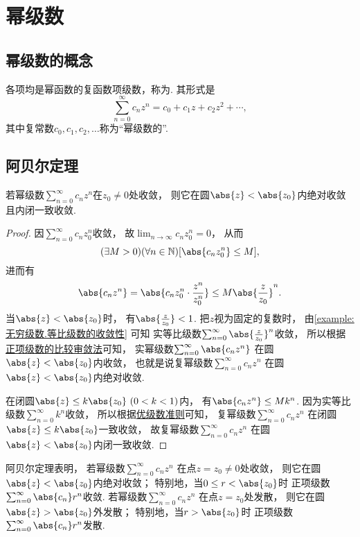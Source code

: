\section{幂级数}
\subsection{幂级数的概念}
\begin{definition}
各项均是幂函数的复函数项级数，称为.
其形式是\[
	\sum_{n=0}^\infty c_n z^n
	= c_0 + c_1 z + c_2 z^2 + \dotsb,
\]
其中复常数\(c_0,c_1,c_2,\dotsc\)称为“幂级数的”.
\end{definition}

\subsection{阿贝尔定理}
\begin{theorem}[阿贝尔定理]\label{theorem:解析函数的级数表示.阿贝尔定理}
若幂级数\(\sum_{n=0}^\infty c_n z^n\)在\(z_0 \neq 0\)处收敛，
则它在圆\(\abs{z} < \abs{z_0}\)内绝对收敛且内闭一致收敛.
\begin{proof}
因\(\sum_{n=0}^\infty c_n z_0^n\)收敛，
故\(\lim_{n\to\infty} c_n z_0^n = 0\)，
从而\[
	(\exists M > 0)
	(\forall n \in \mathbb{N})
	[\abs{c_n z_0^n} \leq M],
\]
进而有\[
	\abs{c_n z^n}
	= \abs{c_n z_0^n \cdot \frac{z^n}{z_0^n}}
	\leq M \abs{\frac{z}{z_0}}^n.
\]
当\(\abs{z} < \abs{z_0}\)时，
有\(\abs{\frac{z}{z_0}} < 1\).
把\(z\)视为固定的复数时，
由\cref{example:无穷级数.等比级数的收敛性} 可知
实等比级数\(\sum_{n=0}^\infty \abs{\frac{z}{z_0}}^n\)收敛，
所以根据\hyperref[theorem:无穷级数.正项级数的比较审敛法]{正项级数的比较审敛法}可知，
实幂级数\(\sum_{n=0}^\infty \abs{c_n z^n}\)
在圆\(\abs{z} < \abs{z_0}\)内收敛，
也就是说复幂级数\(\sum_{n=0}^\infty c_n z^n\)
在圆\(\abs{z} < \abs{z_0}\)内绝对收敛.

在闭圆\(\abs{z} \leq k \abs{z_0}\ (0<k<1)\)内，
有\(\abs{c_n z^n} \leq M k^n\).
因为实等比级数\(\sum_{n=0}^\infty k^n\)收敛，
所以根据\hyperref[theorem:无穷级数.优级数准则]{优级数准则}可知，
复幂级数\(\sum_{n=0}^\infty c_n z^n\)
在闭圆\(\abs{z} \leq k \abs{z_0}\)一致收敛，
故复幂级数\(\sum_{n=0}^\infty c_n z^n\)
在圆\(\abs{z} < \abs{z_0}\)内闭一致收敛.
\end{proof}
\end{theorem}
阿贝尔定理表明，
若幂级数\(\sum_{n=0}^\infty c_n z^n\)
在点\(z = z_0 \neq 0\)处收敛，
则它在圆\(\abs{z} < \abs{z_0}\)内绝对收敛；
特别地，当\(0 \leq r < \abs{z_0}\)时
正项级数\(\sum_{n=0}^\infty \abs{c_n} r^n\)收敛.
若幂级数\(\sum_{n=0}^\infty c_n z^n\)
在点\(z = z_0\)处发散，
则它在圆\(\abs{z} > \abs{z_0}\)外发散；
特别地，当\(r > \abs{z_0}\)时
正项级数\(\sum_{n=0}^\infty \abs{c_n} r^n\)发散.

